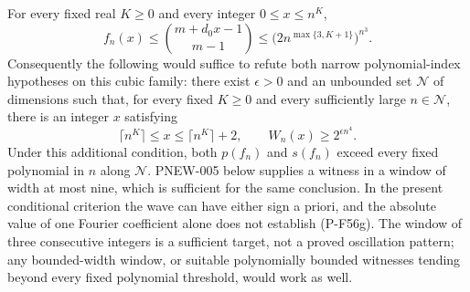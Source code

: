 \begin{proposition}
For every fixed real $K\ge0$ and every integer $0\le x\le n^K$,
\[
 f_n(x)\le\binom{m+d_0x-1}{m-1}
     \le\bigl(2n^{\max\{3,K+1\}}\bigr)^{n^3}.
 \tag{P-F56f}
\]
Consequently the following would suffice to refute both narrow
polynomial-index hypotheses on this cubic family: there exist
$\epsilon>0$ and an unbounded set $\mathcal N$ of dimensions
such that, for every fixed $K\ge0$ and every sufficiently large
$n\in\mathcal N$, there is an integer $x$ satisfying
\[
 \lceil n^K\rceil\le x\le\lceil n^K\rceil+2,
                         \qquad W_n(x)\ge2^{\epsilon n^4}.
 \tag{P-F56g}
\]
Under this additional condition, both $p(f_n)$ and $s(f_n)$
exceed every fixed polynomial in $n$ along $\mathcal N$.
PNEW-005 below supplies a witness in a window of width at most nine,
which is sufficient for the same conclusion. In the present conditional criterion the wave can have
either sign a priori, and the absolute value of one Fourier
coefficient alone does not establish (P-F56g).
The window of three consecutive integers is a sufficient
target, not a proved oscillation pattern; any bounded-width
window, or suitable polynomially bounded witnesses tending
beyond every fixed polynomial threshold, would work as well.
\end{proposition}

